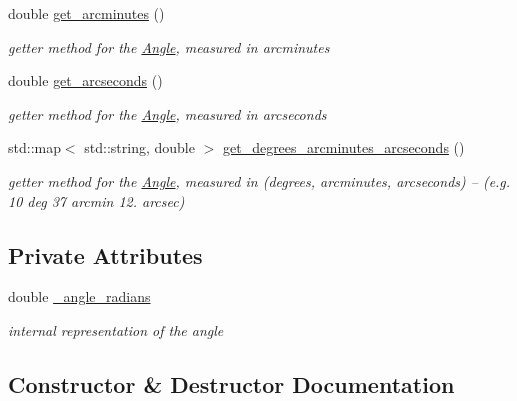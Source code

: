 \begin{DoxyCompactItemize}
double \mbox{\hyperlink{classAngle_a2664851f26ad091294ed0dd2737026b2}{get\+\_\+arcminutes}} ()
\begin{DoxyCompactList}\small\item\em getter method for the \mbox{\hyperlink{classAngle}{Angle}}, measured in arcminutes \end{DoxyCompactList}\item 
double \mbox{\hyperlink{classAngle_a64ecc29aea0d9487058a6bec3f141e54}{get\+\_\+arcseconds}} ()
\begin{DoxyCompactList}\small\item\em getter method for the \mbox{\hyperlink{classAngle}{Angle}}, measured in arcseconds \end{DoxyCompactList}\item 
std\+::map$<$ std\+::string, double $>$ \mbox{\hyperlink{classAngle_a5425dc27480fec42fb3046378a70920e}{get\+\_\+degrees\+\_\+arcminutes\+\_\+arcseconds}} ()
\begin{DoxyCompactList}\small\item\em getter method for the \mbox{\hyperlink{classAngle}{Angle}}, measured in (degrees, arcminutes, arcseconds) -- (e.\+g. 10 deg 37 arcmin 12. arcsec) \end{DoxyCompactList}\end{DoxyCompactItemize}
\subsection*{Private Attributes}
\begin{DoxyCompactItemize}
\item 
\mbox{\label{classAngle_a0985c4f08e7c075f29db63e5e313fe1f}} 
double \mbox{\hyperlink{classAngle_a0985c4f08e7c075f29db63e5e313fe1f}{\+\_\+angle\+\_\+radians}}
\begin{DoxyCompactList}\small\item\em internal representation of the angle \end{DoxyCompactList}\end{DoxyCompactItemize}


\subsection{Constructor \& Destructor Documentation}
\mbox{\label{classAngle_a0c77cde78d872c2353b7b583e5928230}} 
